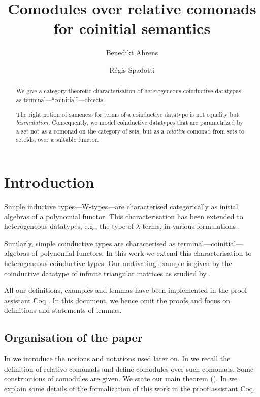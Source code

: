 \documentclass{amsart}
\author{Benedikt Ahrens}
\author{R\'egis Spadotti}
\title[Comodules over relative comonads for coinitial semantics]{Comodules over relative comonads \\ for coinitial semantics}
\begin{document}
\begin{abstract}
  We give a category-theoretic characterisation of heterogeneous coinductive datatypes as terminal---\enquote{coinitial}---objects.
  
  The right notion of sameness for terms of a coinductive datatype is not equality but \emph{bisimulation}.
  Consequently, we model coinductive datatypes that are parametrized by a set not as a comonad on the category of sets,
  but as a \emph{relative} comonad from sets to setoids, over a suitable functor.
\end{abstract}

\maketitle


\section{Introduction}

 Simple inductive types---\textsf{W}-types---are characterised categorically as initial algebras of
 a polynomial functor.
 This characterisation has been extended to heterogeneous datatypes, e.g., the type of $\lambda$-terms,
 in various formulations \parencite{fpt, ahrens_relmonads}.
 
 Similarly, simple coinductive types are characterised as terminal---coinitial---algebras of polynomial functors.
 In this work we extend this characterisation to heterogeneous coinductive types.
 Our motivating example is given by the coinductive datatype of infinite triangular matrices as studied by
 \textcite{DBLP:conf/types/MatthesP11}.

 All our definitions, examples and lemmas have been implemented in the proof assistant \textsf{Coq} \parencite{coq}.
 In this document, we hence omit the proofs and focus on definitions and statements of lemmas.
 
\subsection*{Organisation of the paper}
  In  we introduce the notions and notations used later on.
  In  we recall the definition of relative comonads and define comodules over such comonads.
  Some constructions of comodules are given.
  We state our main theorem ().
  In  we explain some details of the formalization of this work in the proof assistant \textsf{Coq}.
 
\end{document}
